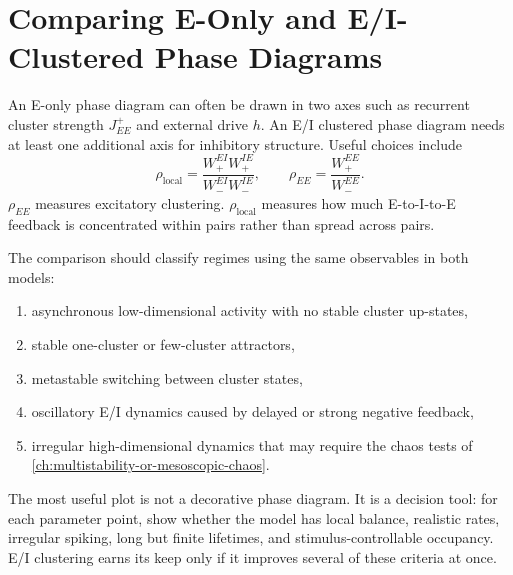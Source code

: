 \section{Comparing E-Only and E/I-Clustered Phase Diagrams}
\label{sec:comparing-e-only-ei-phase-diagrams}

An E-only phase diagram can often be drawn in two axes such as recurrent cluster strength $J_{EE}^{+}$ and external drive $h$. An E/I clustered phase diagram needs at least one additional axis for inhibitory structure. Useful choices include
%
\begin{equation}
  \rho_{\mathrm{local}}
  =
  \frac{W_{+}^{EI}W_{+}^{IE}}{W_{-}^{EI}W_{-}^{IE}},
  \qquad
  \rho_{EE}
  =
  \frac{W_{+}^{EE}}{W_{-}^{EE}}.
  \label{eq:phase-diagram-ratios}
\end{equation}
%
$\rho_{EE}$ measures excitatory clustering. $\rho_{\mathrm{local}}$ measures how much E-to-I-to-E feedback is concentrated within pairs rather than spread across pairs.

The comparison should classify regimes using the same observables in both models:
%
\begin{enumerate}[leftmargin=*]
  \item asynchronous low-dimensional activity with no stable cluster up-states,
  \item stable one-cluster or few-cluster attractors,
  \item metastable switching between cluster states,
  \item oscillatory E/I dynamics caused by delayed or strong negative feedback,
  \item irregular high-dimensional dynamics that may require the chaos tests of \cref{ch:multistability-or-mesoscopic-chaos}.
\end{enumerate}

The most useful plot is not a decorative phase diagram. It is a decision tool: for each parameter point, show whether the model has local balance, realistic rates, irregular spiking, long but finite lifetimes, and stimulus-controllable occupancy. E/I clustering earns its keep only if it improves several of these criteria at once.

